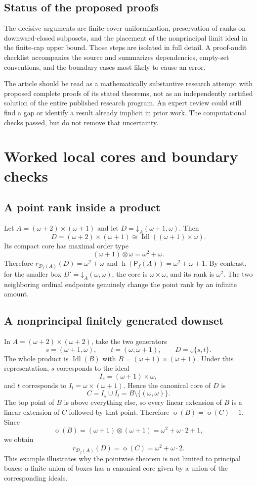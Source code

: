 \documentclass[11pt,letterpaper]{article}
\theoremstyle{teal}
\theoremstyle{definition}
\newcommand{\Pf}{\mathsf P_{\!f}}
\newcommand{\Df}{\mathcal D_{\!f}}
\newcommand{\Idl}{\operatorname{Idl}}
\newcommand{\hgt}{\operatorname{h}}
\newcommand{\mot}{\operatorname{o}}
\newcommand{\dn}{\mathord\downarrow}
\begin{document}
\subsection{Status of the proposed proofs}
The decisive arguments are finite-cover uniformization, preservation of ranks on downward-closed subposets, and the placement of the nonprincipal limit ideal in the finite-cap upper bound. Those steps are isolated in full detail. A proof-audit checklist accompanies the source and summarizes dependencies, empty-set conventions, and the boundary cases most likely to cause an error.

The article should be read as a mathematically substantive research attempt with proposed complete proofs of its stated theorems, not as an independently certified solution of the entire published research program. An expert review could still find a gap or identify a result already implicit in prior work. The computational checks passed, but do not remove that uncertainty.

\appendix
\section{Worked local cores and boundary checks}
\subsection{A point rank inside a product}
Let $A=(\omega+2)\times(\omega+1)$ and let $D=\dn_A(\omega+1,\omega)$. Then
\[
 D=(\omega+2)\times(\omega+1)
 \cong\Idl((\omega+1)\times\omega).
\]
Its compact core has maximal order type
\[
 (\omega+1)\otimes\omega=\omega^2+\omega.
\]
Therefore $r_{\Df(A)}(D)=\omega^2+\omega$ and $\hgt(\Pf(A))=\omega^2+\omega+1$. By contrast, for the smaller box $D'=\dn_A(\omega,\omega)$, the core is $\omega\times\omega$, and its rank is $\omega^2$. The two neighboring ordinal endpoints genuinely change the point rank by an infinite amount.

\subsection{A nonprincipal finitely generated downset}
In $A=(\omega+2)\times(\omega+2)$, take the two generators
\[
 s=(\omega+1,\omega),\qquad t=(\omega,\omega+1),
 \qquad D=\dn\{s,t\}.
\]
The whole product is $\Idl(B)$ with $B=(\omega+1)\times(\omega+1)$. Under this representation, $s$ corresponds to the ideal
\[
 I_s=(\omega+1)\times\omega,
\]
and $t$ corresponds to $I_t=\omega\times(\omega+1)$. Hence the canonical core of $D$ is
\[
 C=I_s\cup I_t=B\setminus\{(\omega,\omega)\}.
\]
The top point of $B$ is above everything else, so every linear extension of $B$ is a linear extension of $C$ followed by that point. Therefore $\mot(B)=\mot(C)+1$. Since
\[
 \mot(B)=(\omega+1)\otimes(\omega+1)=\omega^2+\omega\cdot2+1,
\]
we obtain
\[
 r_{\Df(A)}(D)=\mot(C)=\omega^2+\omega\cdot2.
\]
This example illustrates why the pointwise theorem is not limited to principal boxes: a finite union of boxes has a canonical core given by a union of the corresponding ideals.
\end{document}
